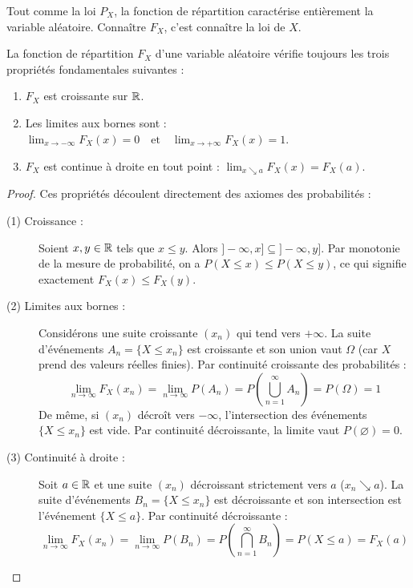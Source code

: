 \begin{remarque}
    Tout comme la loi $P_X$, la fonction de répartition caractérise entièrement la variable aléatoire. Connaître $F_X$, c'est connaître la loi de $X$.
\end{remarque}

\begin{proposition}
    La fonction de répartition $F_X$ d'une variable aléatoire vérifie toujours les trois propriétés fondamentales suivantes :
    \begin{enumerate}
        \item $F_X$ est croissante sur $\mathbb{R}$.
        \item Les limites aux bornes sont : $\displaystyle\lim_{x\to -\infty} F_X(x)=0 \quad \text{et} \quad \lim_{x\to +\infty} F_X(x)=1$.
        \item $F_X$ est continue à droite en tout point : $\displaystyle\lim_{x \searrow a} F_X(x) = F_X(a)$.
    \end{enumerate}
\end{proposition}

\begin{proof}
    Ces propriétés découlent directement des axiomes des probabilités :
    \begin{description}
        \item[(1) Croissance :] Soient $x, y \in \mathbb{R}$ tels que $x \leq y$. Alors $]-\infty, x] \subseteq ]-\infty, y]$. Par monotonie de la mesure de probabilité, on a $P(X \leq x) \leq P(X \leq y)$, ce qui signifie exactement $F_X(x) \leq F_X(y)$.
        
        \item[(2) Limites aux bornes :] Considérons une suite croissante $(x_n)$ qui tend vers $+\infty$. La suite d'événements $A_n = \{X \leq x_n\}$ est croissante et son union vaut $\Omega$ (car $X$ prend des valeurs réelles finies). Par continuité croissante des probabilités :
        \[
        \lim_{n\to \infty} F_X(x_n) = \lim_{n\to \infty} P(A_n) = P\left(\bigcup_{n=1}^\infty A_n\right) = P(\Omega) = 1
        \]
        De même, si $(x_n)$ décroît vers $-\infty$, l'intersection des événements $\{X \leq x_n\}$ est vide. Par continuité décroissante, la limite vaut $P(\varnothing) = 0$.
        
        \item[(3) Continuité à droite :] Soit $a \in \mathbb{R}$ et une suite $(x_n)$ décroissant strictement vers $a$ ($x_n \searrow a$). La suite d'événements $B_n = \{X \leq x_n\}$ est décroissante et son intersection est l'événement $\{X \leq a\}$. Par continuité décroissante :
        \[
        \lim_{n\to \infty} F_X(x_n) = \lim_{n\to \infty} P(B_n) = P\left(\bigcap_{n=1}^\infty B_n\right) = P(X \leq a) = F_X(a)
        \]
    \end{description}
\end{proof}

